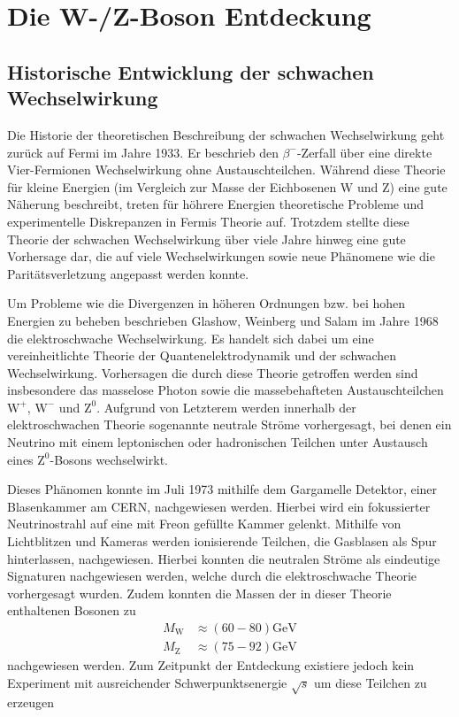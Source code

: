 
\section{Die W-/Z-Boson Entdeckung}


\subsection{Historische Entwicklung der schwachen Wechselwirkung}

Die Historie der theoretischen Beschreibung der schwachen Wechselwirkung geht zurück auf Fermi im Jahre 1933.
Er beschrieb den $\beta^-$-Zerfall über eine direkte Vier-Fermionen Wechselwirkung ohne Austauschteilchen.
Während diese Theorie für kleine Energien (im Vergleich zur Masse der Eichbosenen W und Z) eine gute Näherung beschreibt, treten für höhrere Energien theoretische Probleme und experimentelle Diskrepanzen in Fermis Theorie auf.
Trotzdem stellte diese Theorie der schwachen Wechselwirkung über viele Jahre hinweg eine gute Vorhersage dar, die auf viele Wechselwirkungen sowie neue Phänomene wie die Paritätsverletzung angepasst werden konnte.

Um Probleme wie die Divergenzen in höheren Ordnungen bzw. bei hohen Energien zu beheben beschrieben Glashow, Weinberg und Salam im Jahre 1968 die elektroschwache Wechselwirkung.
Es handelt sich dabei um eine vereinheitlichte Theorie der Quantenelektrodynamik und der schwachen Wechselwirkung.
Vorhersagen die durch diese Theorie getroffen werden sind insbesondere das masselose Photon sowie die massebehafteten Austauschteilchen $\text{W}^+$, $\text{W}^-$ und $\text{Z}^0$.
Aufgrund von Letzterem werden innerhalb der elektroschwachen Theorie sogenannte neutrale Ströme vorhergesagt, bei denen ein Neutrino mit einem leptonischen oder hadronischen Teilchen unter Austausch eines $\text{Z}^0$-Bosons wechselwirkt.

Dieses Phänomen konnte im Juli 1973 mithilfe dem Gargamelle Detektor, einer Blasenkammer am CERN, nachgewiesen werden.
Hierbei wird ein fokussierter Neutrinostrahl auf eine mit Freon gefüllte Kammer gelenkt. 
Mithilfe von Lichtblitzen und Kameras werden ionisierende Teilchen, die Gasblasen als Spur hinterlassen, nachgewiesen.
Hierbei konnten die neutralen Ströme als eindeutige Signaturen nachgewiesen werden, welche durch die elektroschwache Theorie vorhergesagt wurden.
Zudem konnten die Massen der in dieser Theorie enthaltenen Bosonen zu 
\begin{align*}
	M_\text{W} &\approx \left(60-80\right)\si{\giga\electronvolt}\\
	M_\text{Z} &\approx \left(75-92\right)\si{\giga\electronvolt}
\end{align*}
nachgewiesen werden.
Zum Zeitpunkt der Entdeckung existiere jedoch kein Experiment mit ausreichender Schwerpunktsenergie $\sqrt{s}$ um diese Teilchen zu erzeugen

